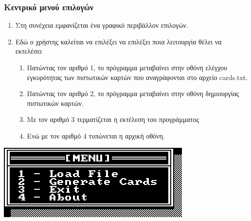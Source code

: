 \documentclass[10pt,a4paper]{article}
\begin{document}
\subsubsection*{Κεντρικό μενού επιλογών}
\begin{enumerate}
\item Στη συνέχεια εμφανίζεται ένα γραφικό περιβάλλον επιλογών.
\item Εδώ ο χρήστης καλείται να επιλέξει να επιλέξει ποια λειτουργία θέλει να εκτελέσει
	\begin{enumerate}
	\item Πατώντας τον αριθμό 1, το πρόγραμμα μεταβαίνει στην οθόνη ελέγχου εγκυρότητας των πιστωτικών καρτών που αναγράφονται στο αρχείο \latintext cards.txt\greektext.
	\item Πατώντας τον αριθμό 2, το πρόγραμμα μεταβαίνει στην οθόνη δημιουργίας πιστωτικών καρτών.
	\item Με τον αριθμό 3 τερματίζεται η εκτέλεση του προγράμματος
	\item Ενώ με τον αριθμό 4 τυπώνεται η αρχική οθόνη.
	\end{enumerate}
\end{enumerate}

\begin{center}
\includegraphics[scale=0.8]{cmenucrop.PNG}
\end{center}
\end{document}
